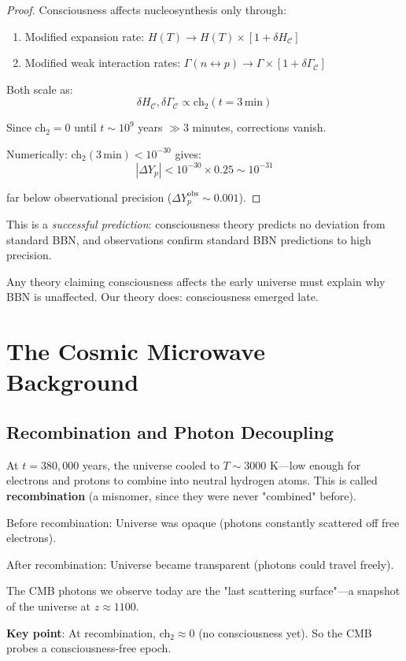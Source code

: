 \begin{proof}
Consciousness affects nucleosynthesis only through:
\begin{enumerate}
\item Modified expansion rate: $H(T) \to H(T) \times [1 + \delta H_{\mathcal{C}}]$
\item Modified weak interaction rates: $\Gamma(n \leftrightarrow p) \to \Gamma \times [1 + \delta \Gamma_{\mathcal{C}}]$
\end{enumerate}

Both scale as:
\begin{equation}
\delta H_{\mathcal{C}}, \delta \Gamma_{\mathcal{C}} \propto \text{ch}_2(t = 3 \, \text{min})
\end{equation}

Since ch$_2 = 0$ until $t \sim 10^9$ years $\gg 3$ minutes, corrections vanish.

Numerically: ch$_2(3 \, \text{min}) < 10^{-30}$ gives:
\begin{equation}
|\Delta Y_p| < 10^{-30} \times 0.25 \sim 10^{-31}
\end{equation}

far below observational precision ($\Delta Y_p^{\text{obs}} \sim 0.001$).
\end{proof}

\begin{remark}
This is a \textit{successful prediction}: consciousness theory predicts no deviation from standard BBN, and observations confirm standard BBN predictions to high precision\cite{cyburt2016,pitrou2018}.

Any theory claiming consciousness affects the early universe must explain why BBN is unaffected. Our theory does: consciousness emerged late.
\end{remark}

\section{The Cosmic Microwave Background}

\subsection{Recombination and Photon Decoupling}

\begin{intuitive}
At $t = 380{,}000$ years, the universe cooled to $T \sim 3000$ K—low enough for electrons and protons to combine into neutral hydrogen atoms. This is called \textbf{recombination} (a misnomer, since they were never "combined" before).

Before recombination: Universe was opaque (photons constantly scattered off free electrons).

After recombination: Universe became transparent (photons could travel freely).

The CMB photons we observe today are the "last scattering surface"—a snapshot of the universe at $z \approx 1100$.

\textbf{Key point}: At recombination, ch$_2 \approx 0$ (no consciousness yet). So the CMB probes a consciousness-free epoch.
\end{intuitive}

